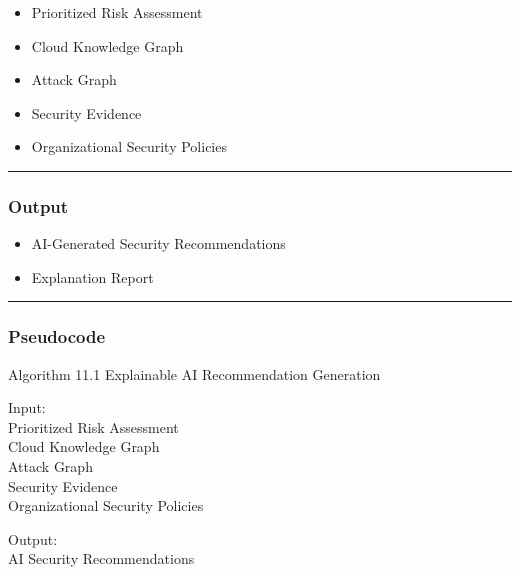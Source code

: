 \begin{itemize}
\tightlist
\item
  Prioritized Risk Assessment\\
\item
  Cloud Knowledge Graph\\
\item
  Attack Graph\\
\item
  Security Evidence\\
\item
  Organizational Security Policies
\end{itemize}

\begin{center}\rule{0.5\linewidth}{0.5pt}\end{center}

\subsubsection{\texorpdfstring{\textbf{Output}}{Output}}

\begin{itemize}
\tightlist
\item
  AI-Generated Security Recommendations\\
\item
  Explanation Report
\end{itemize}

\begin{center}\rule{0.5\linewidth}{0.5pt}\end{center}

\subsubsection{Pseudocode}

Algorithm 11.1 Explainable AI Recommendation Generation

Input:\\
Prioritized Risk Assessment\\
Cloud Knowledge Graph\\
Attack Graph\\
Security Evidence\\
Organizational Security Policies

Output:\\
AI Security Recommendations

